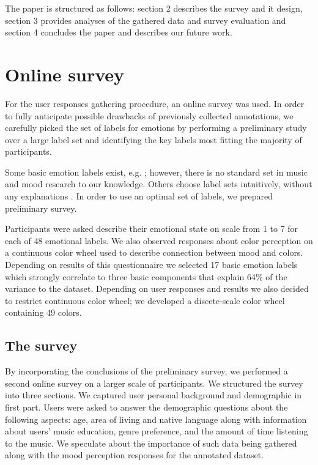 \documentclass[a4paper]{article}
\begin{document}
The paper is structured as follows: section 2 describes the survey and it design, section 3 provides analyses of the gathered data and survey evaluation and section 4 concludes the paper and describes our future work.


\section{Online survey}

For the user responses gathering procedure, an online survey was used. In order to fully anticipate possible drawbacks of previously collected annotations, we carefully picked the set of labels for emotions by performing a preliminary study over a large label set and identifying the key labels most fitting the majority of participants.

Some basic emotion labels exist, e.g. \cite{dalgleish1999handbook}; however, there is no standard set in music and mood research to our knowledge. Others choose label sets intuitively, without any explanations \cite{wu2013spectral}. In order to use an optimal set of labels, we prepared preliminary survey.

Participants were asked describe their emotional state on scale from 1 to 7 for each of 48 emotional labels. We also observed responses about color perception on a continuous color wheel used to describe connection between mood and colors. Depending on results of this questionnaire we selected 17 basic emotion labels which strongly correlate to three basic components that explain 64\% of the variance to the dataset. Depending on user responses and results we also decided to restrict continuous color wheel; we developed a discete-scale color wheel containing 49 colors. 

\subsection{The survey}

By incorporating the conclusions of the preliminary survey, we performed a second  online survey on a larger scale of participants. We structured the survey into three sections. We captured user personal background and demographic in first part. Users were asked to answer the demographic questions about the following aspects: age, area of living and native language along with information about users' music education, genre preference, and the amount of time listening to the music. We speculate about the importance of such data being gathered along with the mood perception responses for the annotated dataset. 
\end{document}
